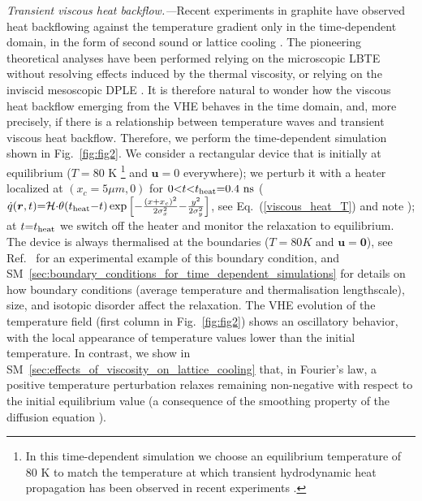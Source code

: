\documentclass[
prb,
twocolumn,
superscriptaddress,
 amsmath,amssymb,
 aps,
longbibliography,
]{revtex4-2}
\begin{document}
\textit{Transient viscous heat backflow.---}Recent experiments in graphite have observed heat backflowing against the temperature gradient only in the time-dependent domain, in the form of second sound \cite{Huberman2019,Ding2022} or lattice cooling \cite{Jeong2021}. The pioneering theoretical analyses have been performed relying on the microscopic LBTE \cite{cepellotti_transport_2017,Huberman2019,Ding2022,zhang_transient_2021,Jeong2021}
without resolving effects induced by the thermal viscosity, or relying on the inviscid mesoscopic DPLE \cite{joseph_heat_1989,tzou_unified_1995,xu_thermal_2002,ordonez-miranda_exact_2010,kang_method_2017,gandolfi_accessing_2019,xu_thermal_2021,mazza_thermal_2021}.
It is therefore natural to wonder how the viscous heat backflow emerging from the VHE behaves in the time domain, and, more precisely, if there is a relationship between temperature waves and transient viscous heat backflow.
Therefore, we perform the time-dependent simulation shown in Fig.~\ref{fig:fig2}. We consider a rectangular device that is initially at equilibrium ($T{=}80$ K \footnote{In this time-dependent simulation we choose an equilibrium temperature of 80 K to match the temperature at which transient hydrodynamic heat propagation has been observed in recent experiments \cite{Huberman2019,Jeong2021}.} and $\bm{u}{=}0$ everywhere); we perturb it with a heater localized at $(x_c=5\mu m,0)$ for $0{<}t{<}t_{\rm heat}{=}0.4\ \mathrm{ns}$ ($\dot{q}(\bm{r},t){=}\mathcal{H}{\cdot}\theta(t_{\rm heat}{-}t) \exp\left[{-}\tfrac{(x+x_c)^2}{2\sigma_x^2}{-}\tfrac{y^2}{2\sigma_y^2}\right]$, see Eq.~(\ref{viscous_heat_T}) and note \cite{footnote_param}); at $t{=}t_{\rm heat}$ we switch off the heater and monitor the relaxation to equilibrium. The device is always thermalised at the boundaries ($T{=}80K$ and $\bm{u}{=}\bm{0}$), see Ref.~\cite{braun_spatially_2022} for an experimental example of this boundary condition, and SM~\ref{sec:boundary_conditions_for_time_dependent_simulations} for details on how boundary conditions (average temperature and thermalisation lengthscale), size, and isotopic disorder affect the relaxation.
The VHE evolution of the temperature field (first column in Fig.~\ref{fig:fig2}) shows an oscillatory behavior, with the local appearance of temperature values lower than the initial temperature. In contrast, we show in SM~\ref{sec:effects_of_viscosity_on_lattice_cooling} that, in Fourier's law, a positive temperature perturbation relaxes remaining non-negative with respect to the initial equilibrium value (a consequence of the smoothing
property of the diffusion equation \cite{skinner_university_nodate}).
\end{document}
